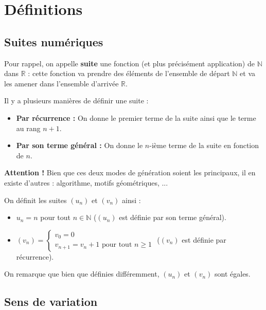 


	
	\section{Définitions}
	
	\subsection{Suites numériques}
	
	Pour rappel, on appelle \textbf{suite} une fonction (et plus précisément application) de $\mathbb{N}$ dans $\mathbb{R}$ : cette fonction va prendre des éléments de l'ensemble de départ $\mathbb{N}$ et va les amener dans l'ensemble d'arrivée $\mathbb{R}$.
	
	\begin{formula}[Définition]
		Il y a plusieurs manières de définir une suite :
		\begin{itemize}
			\item \textbf{Par récurrence :} On donne le premier terme de la suite ainsi que le terme au rang $n+1$.
			\item \textbf{Par son terme général :} On donne le $n$-ième terme de la suite en fonction de $n$.
		\end{itemize}
	\end{formula}
	
	\textbf{Attention !} Bien que ces deux modes de génération soient les principaux, il en existe d'autres : algorithme, motifs géométriques, ...
	
	\begin{tip}[Exemple]
		On définit les suites $(u_n)$ et $(v_n)$ ainsi :
		\begin{itemize}
			\item $u_n = n$ pour tout $n \in \mathbb{N}$ ($(u_n)$ est définie par son terme général).
			\item $(v_n) = \begin{cases} v_0 = 0 \\ v_{n+1} = v_n + 1 \text{ pour tout } n \geq 1 \end{cases}$ ($(v_n)$ est définie par récurrence).
		\end{itemize}
		On remarque que bien que définies différemment, $(u_n)$ et $(v_n)$ sont égales.
	\end{tip}
	
	\subsection{Sens de variation}
	
